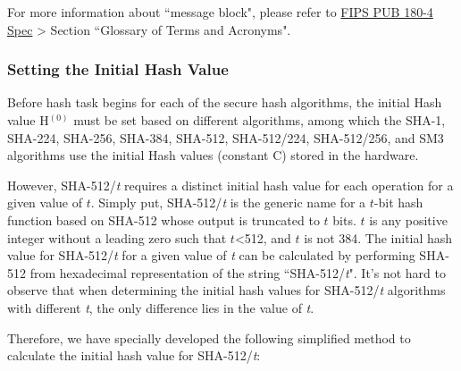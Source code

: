 \documentclass[main\_\_EN.tex]{subfiles}
\begin{document}
\begin{tiplisting}
\vspace{-0.5em}
For more information about ``message block", please refer to \href{https://doi.org/10.6028/NIST.FIPS.180-4}{FIPS PUB 180-4 Spec} > Section ``Glossary of Terms and Acronyms".
\end{tiplisting}

\subsubsection{Setting the Initial Hash Value}\label{sec:sha-initial-hash}

Before hash task begins for each of the secure hash algorithms, the initial Hash value H$^{(0)}$ must be set based on different algorithms, among which the SHA-1, SHA-224, SHA-256, SHA-384, SHA-512, SHA-512/224, SHA-512/256, and SM3 algorithms use the initial Hash values (constant C) stored in the hardware. 

However, SHA-512/{\it{t}} requires a distinct initial hash value for each operation for a given value of \begin{math}t\end{math}. Simply put, SHA-512/{\it{t}} is the generic name for a \begin{math}t\end{math}-bit hash function based on SHA-512 whose output is truncated to \begin{math}t\end{math} bits. \begin{math}t\end{math} is any positive integer without a leading zero such that \begin{math}t\end{math}<512, and \begin{math}t\end{math} is not 384. The initial hash value for SHA-512/{\it{t}} for a given value of {\it{t}} can be calculated by performing SHA-512 from hexadecimal representation of the string ``SHA-512/{\it{t}}". It's not hard to observe that when determining the initial hash values for SHA-512/{\it{t}} algorithms with different {\it{t}}, the only difference lies in the value of {\it{t}}.

Therefore, we have specially developed the following simplified method to calculate the initial hash value for SHA-512/{\it{t}}: 
\end{document}
